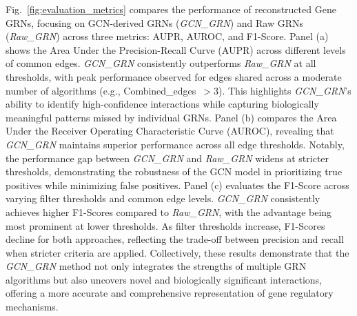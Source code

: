 \documentclass{article}
\begin{document}
Fig.~\ref{fig:evaluation_metrics} compares the performance of reconstructed Gene GRNs, focusing on GCN-derived GRNs (\textit{GCN\_GRN}) and Raw GRNs (\textit{Raw\_GRN}) across three metrics: AUPR, AUROC, and F1-Score. Panel (a) shows the Area Under the Precision-Recall Curve (AUPR) across different levels of common edges. \textit{GCN\_GRN} consistently outperforms \textit{Raw\_GRN} at all thresholds, with peak performance observed for edges shared across a moderate number of algorithms (e.g., Combined\_edges~$>$3). This highlights \textit{GCN\_GRN}'s ability to identify high-confidence interactions while capturing biologically meaningful patterns missed by individual GRNs. Panel (b) compares the Area Under the Receiver Operating Characteristic Curve (AUROC), revealing that \textit{GCN\_GRN} maintains superior performance across all edge thresholds. Notably, the performance gap between \textit{GCN\_GRN} and \textit{Raw\_GRN} widens at stricter thresholds, demonstrating the robustness of the GCN model in prioritizing true positives while minimizing false positives. Panel (c) evaluates the F1-Score across varying filter thresholds and common edge levels. \textit{GCN\_GRN} consistently achieves higher F1-Scores compared to \textit{Raw\_GRN}, with the advantage being most prominent at lower thresholds. As filter thresholds increase, F1-Scores decline for both approaches, reflecting the trade-off between precision and recall when stricter criteria are applied. Collectively, these results demonstrate that the \textit{GCN\_GRN} method not only integrates the strengths of multiple GRN algorithms but also uncovers novel and biologically significant interactions, offering a more accurate and comprehensive representation of gene regulatory mechanisms.
\end{document}
